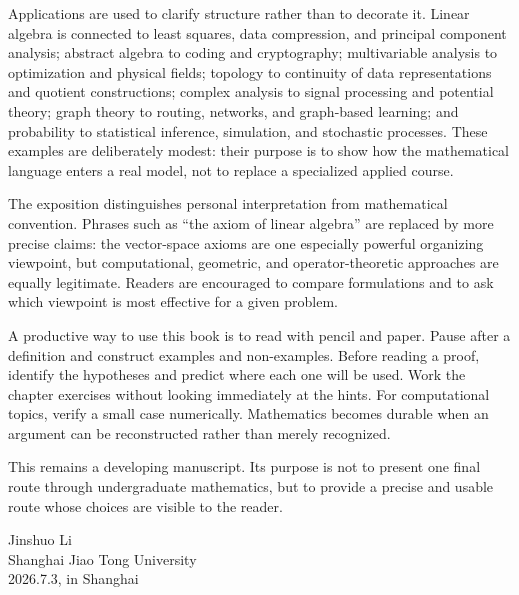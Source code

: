 Applications are used to clarify structure rather than to decorate it. Linear algebra is connected to least squares, data compression, and principal component analysis; abstract algebra to coding and cryptography; multivariable analysis to optimization and physical fields; topology to continuity of data representations and quotient constructions; complex analysis to signal processing and potential theory; graph theory to routing, networks, and graph-based learning; and probability to statistical inference, simulation, and stochastic processes. These examples are deliberately modest: their purpose is to show how the mathematical language enters a real model, not to replace a specialized applied course.

The exposition distinguishes personal interpretation from mathematical convention. Phrases such as “the axiom of linear algebra” are replaced by more precise claims: the vector-space axioms are one especially powerful organizing viewpoint, but computational, geometric, and operator-theoretic approaches are equally legitimate. Readers are encouraged to compare formulations and to ask which viewpoint is most effective for a given problem.

A productive way to use this book is to read with pencil and paper. Pause after a definition and construct examples and non-examples. Before reading a proof, identify the hypotheses and predict where each one will be used. Work the chapter exercises without looking immediately at the hints. For computational topics, verify a small case numerically. Mathematics becomes durable when an argument can be reconstructed rather than merely recognized.

This remains a developing manuscript. Its purpose is not to present one final route through undergraduate mathematics, but to provide a precise and usable route whose choices are visible to the reader.

\begin{flushright}
Jinshuo Li \\
Shanghai Jiao Tong University \\
2026.7.3, in Shanghai
\end{flushright}
